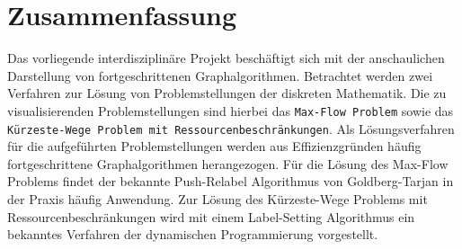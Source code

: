 %
%
%
%

\section*{Zusammenfassung}
Das vorliegende interdisziplinäre Projekt beschäftigt sich mit der anschaulichen Darstellung von fortgeschrittenen Graphalgorithmen. Betrachtet werden zwei Verfahren zur Lösung von Problemstellungen der diskreten Mathematik. Die zu visualisierenden Problemstellungen sind hierbei das \texttt{Max-Flow Problem} sowie das \texttt{Kürzeste-Wege Problem mit Ressourcenbeschränkungen}.
Als Lösungsverfahren für die aufgeführten Problemstellungen werden aus Effizienzgründen häufig fortgeschrittene Graphalgorithmen herangezogen. Für die Lösung des Max-Flow Problems findet der bekannte Push-Relabel Algorithmus von Goldberg-Tarjan in der Praxis häufig Anwendung. Zur Lösung des Kürzeste-Wege Problems mit Ressourcenbeschränkungen wird mit einem Label-Setting Algorithmus ein bekanntes Verfahren der dynamischen Programmierung vorgestellt.


